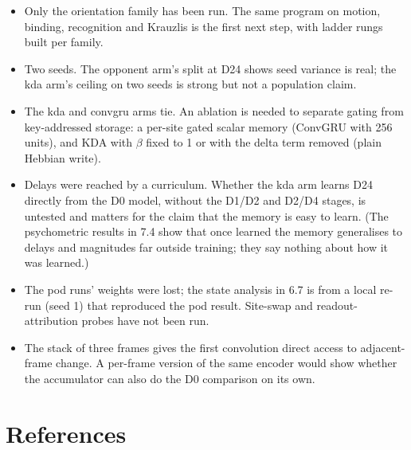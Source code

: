 \documentclass[

]{article}
\providecommand{\tightlist}{%

  \setlength{\itemsep}{0pt}\setlength{\parskip}{0pt}}
\begin{document}
\begin{itemize}

\tightlist

\item

  Only the orientation family has been run. The same program on motion, binding, recognition and Krauzlis is the first next step, with ladder rungs built per family.

\item

  Two seeds. The opponent arm's split at D24 shows seed variance is real; the kda arm's ceiling on two seeds is strong but not a population claim.

\item

  The kda and convgru arms tie. An ablation is needed to separate gating from key-addressed storage: a per-site gated scalar memory (ConvGRU with 256 units), and KDA with \(\beta\) fixed to 1 or with the delta term removed (plain Hebbian write).

\item

  Delays were reached by a curriculum. Whether the kda arm learns D24 directly from the D0 model, without the D1/D2 and D2/D4 stages, is untested and matters for the claim that the memory is easy to learn. (The psychometric results in 7.4 show that once learned the memory generalises to delays and magnitudes far outside training; they say nothing about how it was learned.)

\item

  The pod runs' weights were lost; the state analysis in 6.7 is from a local re-run (seed 1) that reproduced the pod result. Site-swap and readout-attribution probes have not been run.

\item

  The stack of three frames gives the first convolution direct access to adjacent-frame change. A per-frame version of the same encoder would show whether the accumulator can also do the D0 comparison on its own.

\end{itemize}



\section{References}\label{references}
\end{document}
